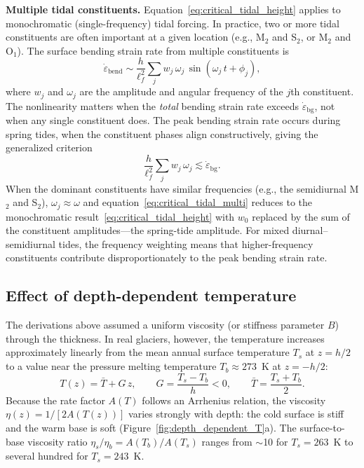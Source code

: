 \documentclass[11pt]{article}
\begin{document}
\medskip
\noindent\textbf{Multiple tidal constituents.}  Equation~\eqref{eq:critical_tidal_height} applies to monochromatic (single-frequency) tidal forcing.  In practice, two or more tidal constituents are often important at a given location (e.g., M$_2$ and S$_2$, or M$_2$ and O$_1$).  The surface bending strain rate from multiple constituents is
\begin{equation}
  \dot{\varepsilon}_{\text{bend}} \sim \frac{h}{\ell_f^2}\sum_j w_j\,\omega_j\,\sin(\omega_j\,t + \phi_j),
\end{equation}
where $w_j$ and $\omega_j$ are the amplitude and angular frequency of the $j$th constituent.  The nonlinearity matters when the \textit{total} bending strain rate exceeds $\dot{\varepsilon}_{\text{bg}}$, not when any single constituent does.  The peak bending strain rate occurs during spring tides, when the constituent phases align constructively, giving the generalized criterion
\begin{equation}
  \boxed{\frac{h}{\ell_f^2}\sum_j w_j\,\omega_j \lesssim \dot{\varepsilon}_{\text{bg}}.}
  \label{eq:critical_tidal_multi}
\end{equation}
When the dominant constituents have similar frequencies (e.g., the semidiurnal M$_2$ and S$_2$), $\omega_j \approx \omega$ and equation~\eqref{eq:critical_tidal_multi} reduces to the monochromatic result~\eqref{eq:critical_tidal_height} with $w_0$ replaced by the sum of the constituent amplitudes---the spring-tide amplitude.  For mixed diurnal--semidiurnal tides, the frequency weighting means that higher-frequency constituents contribute disproportionately to the peak bending strain rate.

\subsection*{Effect of depth-dependent temperature}

The derivations above assumed a uniform viscosity (or stiffness parameter $B$) through the thickness.  In real glaciers, however, the temperature increases approximately linearly from the mean annual surface temperature $T_s$ at $z = h/2$ to a value near the pressure melting temperature $T_b \approx 273$~K at $z = -h/2$:
\begin{equation}
  T(z) = \bar{T} + G\,z, \qquad G = \frac{T_s - T_b}{h} < 0, \qquad \bar{T} = \frac{T_s + T_b}{2}.
  \label{eq:linear_T}
\end{equation}
Because the rate factor $A(T)$ follows an Arrhenius relation, the viscosity $\eta(z) = 1/[2A(T(z))]$ varies strongly with depth: the cold surface is stiff and the warm base is soft (Figure~\ref{fig:depth_dependent_T}a).  The surface-to-base viscosity ratio $\eta_s/\eta_b = A(T_b)/A(T_s)$ ranges from $\sim$10 for $T_s = 263$~K to several hundred for $T_s = 243$~K.
\end{document}
